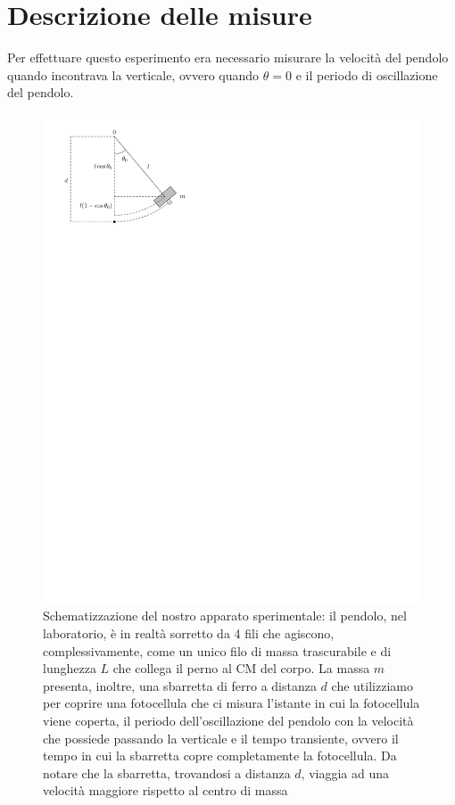 \documentclass{article}
\begin{document}
	\section{Descrizione delle misure}
	Per effettuare questo esperimento era necessario misurare la velocità del pendolo quando incontrava la verticale, ovvero quando $\theta = 0$ e il periodo di oscillazione del pendolo. 
	\begin{figure}[htbp]
		\centering
  		\includegraphics[scale=0.80]{pendolo_fisico_2.pdf}
  		\caption{Schematizzazione del nostro apparato sperimentale: il pendolo, nel laboratorio, è in realtà sorretto da 4 fili che agiscono, complessivamente, come un unico filo di massa trascurabile e di lunghezza $L$ che collega il perno al CM del corpo. La massa $m$ presenta, inoltre, una sbarretta di ferro a distanza $d$ che utilizziamo per coprire una fotocellula che ci misura l'istante in cui la fotocellula viene coperta, il periodo dell'oscillazione del pendolo con la velocità che possiede passando la verticale e il tempo transiente, ovvero il tempo in cui la sbarretta copre completamente la fotocellula. Da notare che la sbarretta, trovandosi a distanza $d$, viaggia ad una velocità maggiore rispetto al centro di massa}
  		\label{fig:pendolo}
	\end{figure}	
\end{document}
